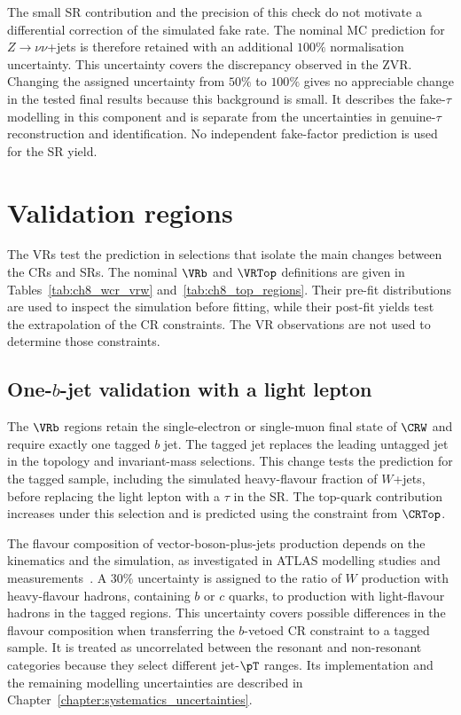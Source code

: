 The small SR contribution and the precision of this check do not motivate a differential correction of the simulated fake rate.
The nominal MC prediction for $Z\to\nu\nu$+jets is therefore retained with an additional $100\%$ normalisation uncertainty.
This uncertainty covers the discrepancy observed in the ZVR.
Changing the assigned uncertainty from $50\%$ to $100\%$ gives no appreciable change in the tested final results because this background is small.
It describes the fake-$\tau$ modelling in this component and is separate from the uncertainties in genuine-$\tau$ reconstruction and identification.
No independent fake-factor prediction is used for the SR yield.


\clearpage
\section{Validation regions}
\label{sec:ch8_validation}

The VRs test the prediction in selections that isolate the main changes between the CRs and SRs.
The nominal $\VRb$ and $\VRTop$ definitions are given in Tables~\ref{tab:ch8_wcr_vrw} and~\ref{tab:ch8_top_regions}.
Their pre-fit distributions are used to inspect the simulation before fitting, while their post-fit yields test the extrapolation of the CR constraints.
The VR observations are not used to determine those constraints.

\subsection[One b-jet validation with a light lepton]{One-$b$-jet validation with a light lepton}
\label{subsec:ch8_vrw}

The $\VRb$ regions retain the single-electron or single-muon final state of $\CRW$ and require exactly one tagged $b$ jet.
The tagged jet replaces the leading untagged jet in the topology and invariant-mass selections.
This change tests the prediction for the tagged sample, including the simulated heavy-flavour fraction of $W$+jets, before replacing the light lepton with a $\tau$ in the SR.
The top-quark contribution increases under this selection and is predicted using the constraint from $\CRTop$.

The flavour composition of vector-boson-plus-jets production depends on the kinematics and the simulation, as investigated in ATLAS modelling studies and measurements~\cite{PMGR-2021-01,STDM-2018-43,HIGG-2020-20}.
A $30\%$ uncertainty is assigned to the ratio of $W$ production with heavy-flavour hadrons, containing $b$ or $c$ quarks, to production with light-flavour hadrons in the tagged regions.
This uncertainty covers possible differences in the flavour composition when transferring the $b$-vetoed CR constraint to a tagged sample.
It is treated as uncorrelated between the resonant and non-resonant categories because they select different jet-$\pT$ ranges.
Its implementation and the remaining modelling uncertainties are described in Chapter~\ref{chapter:systematics_uncertainties}.


